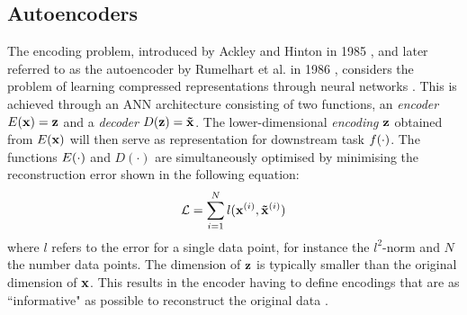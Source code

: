 \subsection{Autoencoders}
The encoding problem, introduced by Ackley and Hinton in 1985 \citep{ackleyLearningAlgorithmBoltzmann1985}, and later referred to as the autoencoder by Rumelhart et al. in 1986 \citep{rumelhartLearningInternalRepresentations1988}, considers the problem of learning compressed representations through neural networks \citep{rumelhartLearningInternalRepresentations1988, bankAutoencoders2021}. This is achieved through an ANN architecture consisting of two functions, an \textit{encoder} $E(\mathbf{x}) = \mathbf{z}$ and a \textit{decoder} $D(\mathbf{z}) = \mathbf{\tilde{x}}$.
The lower-dimensional \textit{encoding} $\mathbf{z}$ obtained from $E(\mathbf{x})$ will then serve as representation for downstream task $f(\cdot)$.
The functions $E(\cdot)$ and $D(\cdot)$ are simultaneously optimised by minimising the reconstruction error shown in the following equation:
\begin{equation}
	\mathcal{L} = \sum_{i = 1}^N l(\mathbf{x}^{(i)}, \mathbf{\tilde{x}}^{(i)})
\end{equation}
where $l$ refers to the error for a single data point, for instance the $l^2$-norm and $N$ the number data points. The dimension of $\mathbf{z}$ is typically smaller than the original dimension of $\mathbf{x}$. This results in the encoder having to define encodings that are as ``informative" as possible to reconstruct the original data \citep{bankAutoencoders2021}.

